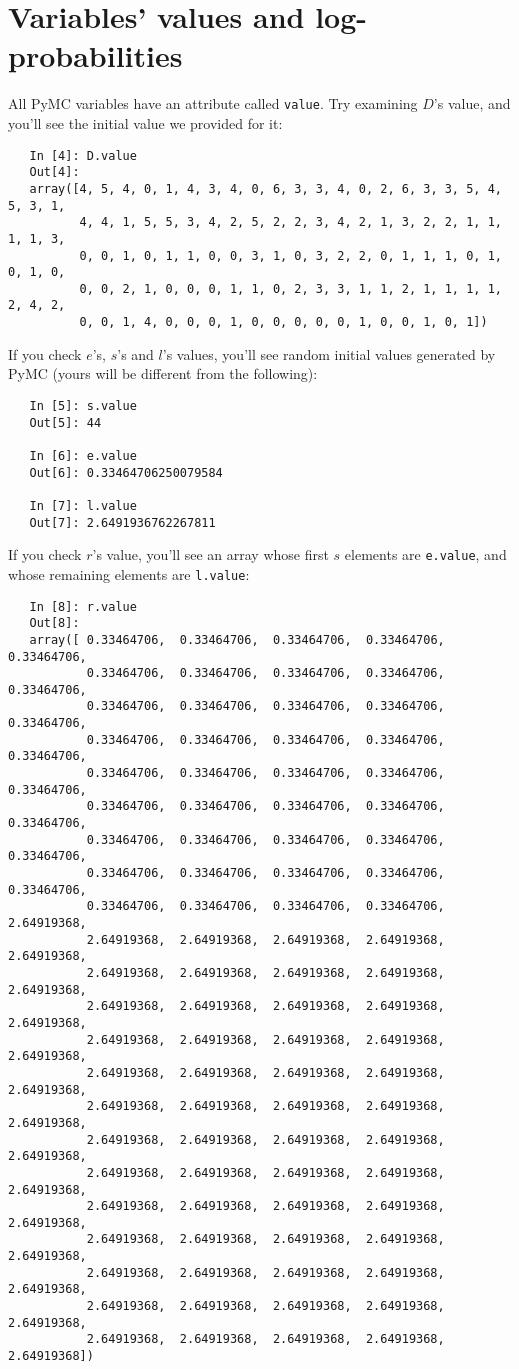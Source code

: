 \section*{Variables' values and log-probabilities}
All PyMC variables have an attribute called \texttt{value}. Try examining $D$'s value, and you'll see the initial value we provided for it:
\begin{verbatim}
   In [4]: D.value
   Out[4]: 
   array([4, 5, 4, 0, 1, 4, 3, 4, 0, 6, 3, 3, 4, 0, 2, 6, 3, 3, 5, 4, 5, 3, 1,
          4, 4, 1, 5, 5, 3, 4, 2, 5, 2, 2, 3, 4, 2, 1, 3, 2, 2, 1, 1, 1, 1, 3,
          0, 0, 1, 0, 1, 1, 0, 0, 3, 1, 0, 3, 2, 2, 0, 1, 1, 1, 0, 1, 0, 1, 0,
          0, 0, 2, 1, 0, 0, 0, 1, 1, 0, 2, 3, 3, 1, 1, 2, 1, 1, 1, 1, 2, 4, 2,
          0, 0, 1, 4, 0, 0, 0, 1, 0, 0, 0, 0, 0, 1, 0, 0, 1, 0, 1])
\end{verbatim}
If you check $e$'s, $s$'s and $l$'s values, you'll see random initial values generated by PyMC (yours will be different from the following):
\begin{verbatim}
   In [5]: s.value
   Out[5]: 44

   In [6]: e.value
   Out[6]: 0.33464706250079584

   In [7]: l.value
   Out[7]: 2.6491936762267811
\end{verbatim}
If you check $r$'s value, you'll see an array whose first $s$ elements are \texttt{e.value}, and whose remaining elements are \texttt{l.value}:
\begin{verbatim}
   In [8]: r.value
   Out[8]: 
   array([ 0.33464706,  0.33464706,  0.33464706,  0.33464706,  0.33464706,
           0.33464706,  0.33464706,  0.33464706,  0.33464706,  0.33464706,
           0.33464706,  0.33464706,  0.33464706,  0.33464706,  0.33464706,
           0.33464706,  0.33464706,  0.33464706,  0.33464706,  0.33464706,
           0.33464706,  0.33464706,  0.33464706,  0.33464706,  0.33464706,
           0.33464706,  0.33464706,  0.33464706,  0.33464706,  0.33464706,
           0.33464706,  0.33464706,  0.33464706,  0.33464706,  0.33464706,
           0.33464706,  0.33464706,  0.33464706,  0.33464706,  0.33464706,
           0.33464706,  0.33464706,  0.33464706,  0.33464706,  2.64919368,
           2.64919368,  2.64919368,  2.64919368,  2.64919368,  2.64919368,
           2.64919368,  2.64919368,  2.64919368,  2.64919368,  2.64919368,
           2.64919368,  2.64919368,  2.64919368,  2.64919368,  2.64919368,
           2.64919368,  2.64919368,  2.64919368,  2.64919368,  2.64919368,
           2.64919368,  2.64919368,  2.64919368,  2.64919368,  2.64919368,
           2.64919368,  2.64919368,  2.64919368,  2.64919368,  2.64919368,
           2.64919368,  2.64919368,  2.64919368,  2.64919368,  2.64919368,
           2.64919368,  2.64919368,  2.64919368,  2.64919368,  2.64919368,
           2.64919368,  2.64919368,  2.64919368,  2.64919368,  2.64919368,
           2.64919368,  2.64919368,  2.64919368,  2.64919368,  2.64919368,
           2.64919368,  2.64919368,  2.64919368,  2.64919368,  2.64919368,
           2.64919368,  2.64919368,  2.64919368,  2.64919368,  2.64919368,
           2.64919368,  2.64919368,  2.64919368,  2.64919368,  2.64919368])
\end{verbatim}
